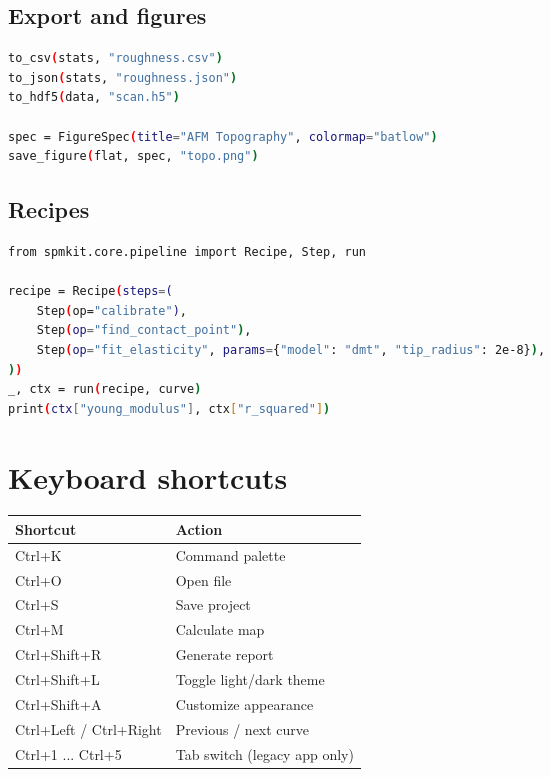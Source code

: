 \documentclass[a4paper,11pt]{article}
\begin{document}
\subsection{Export and figures}

\begin{lstlisting}[language=bash]
to_csv(stats, "roughness.csv")
to_json(stats, "roughness.json")
to_hdf5(data, "scan.h5")

spec = FigureSpec(title="AFM Topography", colormap="batlow")
save_figure(flat, spec, "topo.png")
\end{lstlisting}

\subsection{Recipes}

\begin{lstlisting}[language=bash]
from spmkit.core.pipeline import Recipe, Step, run

recipe = Recipe(steps=(
    Step(op="calibrate"),
    Step(op="find_contact_point"),
    Step(op="fit_elasticity", params={"model": "dmt", "tip_radius": 2e-8}),
))
_, ctx = run(recipe, curve)
print(ctx["young_modulus"], ctx["r_squared"])
\end{lstlisting}

\section{Keyboard shortcuts}

\begin{tabularx}{\linewidth}{@{}>{\ttfamily}l X@{}}
\toprule
Shortcut & Action \\
\midrule
Ctrl+K & Command palette \\
Ctrl+O & Open file \\
Ctrl+S & Save project \\
Ctrl+M & Calculate map \\
Ctrl+Shift+R & Generate report \\
Ctrl+Shift+L & Toggle light/dark theme \\
Ctrl+Shift+A & Customize appearance \\
Ctrl+Left / Ctrl+Right & Previous / next curve \\
Ctrl+1 ... Ctrl+5 & Tab switch (legacy app only) \\
\bottomrule
\end{tabularx}
\end{document}
